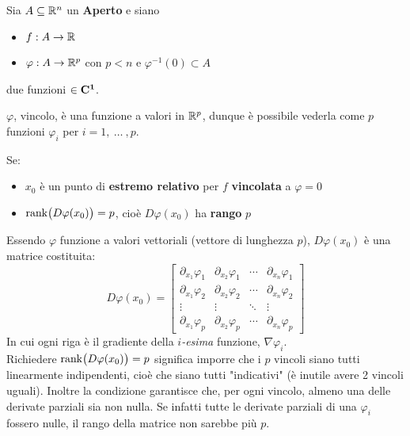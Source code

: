 \newpage %
\begin{theorem}
	\label{teo:molt_lagr_gen}
	Sia $A \subseteq \mathbb{R}^n$ un \textbf{Aperto} e siano
	\begin{itemize}[noitemsep]
		\item $f: A \to \mathbb{R}$
		\item $\varphi: A \to \mathbb{R}^p$ con $p < n$ e $\varphi^{-1}(0) \subset A$
	\end{itemize}
	due funzioni $\in \mathbf{C^{1}}$.
	\begin{note}
		$\varphi$, vincolo, è una funzione a valori in $\mathbb{R}^p$, dunque è possibile vederla come $p$ funzioni $\varphi_i$ per $i = 1,\:\dotsc\:,p$.
	\end{note}
	Se:
	\begin{itemize}[noitemsep]
		\item $x_0$ è un punto di \textbf{estremo relativo} per $f$ \textbf{vincolata} a $\varphi = 0$
		\item $\operatorname{rank} \bigl( D\varphi(x_0) \bigr) = p$, cioè $D\varphi(x_0)$ ha \textbf{rango} $p$
	\end{itemize}
	\begin{note}
		\hypertarget{note:teo_molt_lagr_gen}{}
		Essendo $\varphi$ funzione a valori vettoriali (vettore di lunghezza $p$), $D\varphi(x_0)$ è una matrice costituita:
		\[
			D\varphi(x_0) =
			\begin{bmatrix}
				\partial_{x_1} \varphi_1 & \partial_{x_2} \varphi_1 & \cdots & \partial_{x_n} \varphi_1\\
				\partial_{x_1} \varphi_2 & \partial_{x_2} \varphi_2 & \cdots & \partial_{x_n} \varphi_2\\
				\vdots & \vdots & \ddots & \vdots\\
				\partial_{x_1} \varphi_p & \partial_{x_2} \varphi_p & \cdots & \partial_{x_n} \varphi_p
			\end{bmatrix}
		\]
		In cui ogni riga è il gradiente della $i$\textit{-esima} funzione, $\nabla \varphi_i$.\\
		Richiedere $\operatorname{rank} \bigl( D\varphi(x_0) \bigr) = p$ significa imporre che i $p$ vincoli siano tutti linearmente indipendenti, cioè che siano tutti "indicativi" (è inutile avere 2 vincoli uguali). Inoltre la condizione garantisce che, per ogni vincolo, almeno una delle derivate parziali sia non nulla. Se infatti tutte le derivate parziali di una $\varphi_i$ fossero nulle, il rango della matrice non sarebbe più $p$.

\end{note}
\end{theorem}
